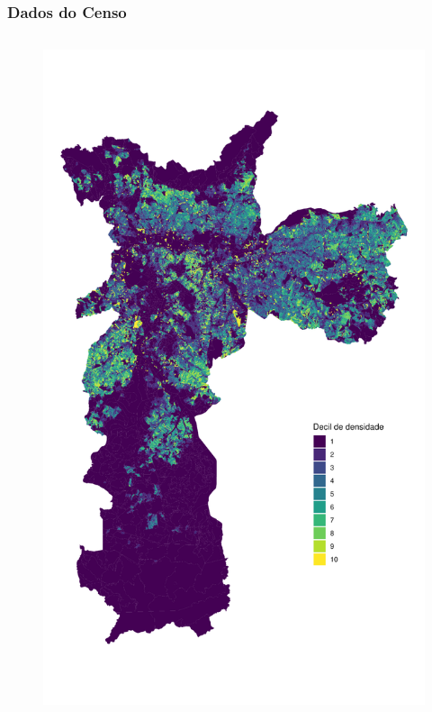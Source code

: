 \documentclass[%
    9pt, 
    aspectratio=169,
]{beamer}
\begin{document}
\begin{frame}
    \frametitle{Dados do Censo}
    \begin{columns}
        \begin{figure}
            \centering
            \includegraphics[height=.95\textheight]{imagens/mapa.pdf}
        \end{figure}


\end{columns}
\end{frame}
\end{document}
